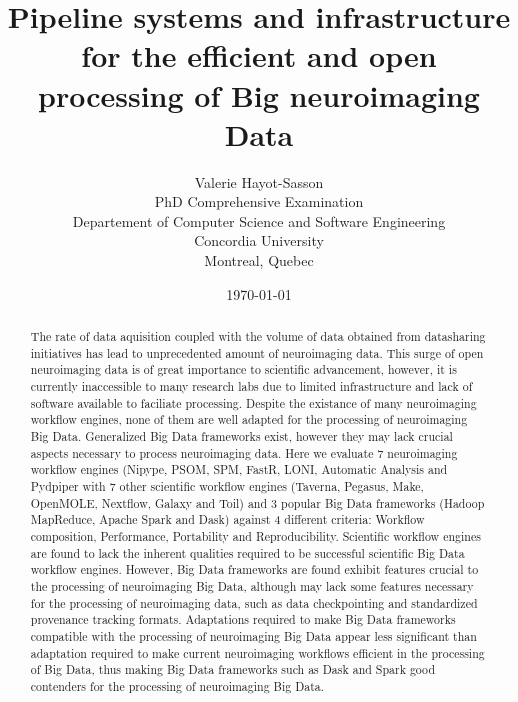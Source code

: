 \documentclass{report}
\begin{document}
 
    \title{Pipeline systems and infrastructure for the efficient
            and open processing of Big neuroimaging Data} 
    \author{Valerie Hayot-Sasson \\
    PhD Comprehensive Examination\\
    Departement of Computer Science and Software Engineering \\
    Concordia University \\
    Montreal, Quebec
    }
    \date{\today}
    \maketitle 
    
    \begin{abstract}
        The rate of data aquisition coupled with the volume of data obtained 
        from datasharing initiatives has lead to unprecedented amount of 
        neuroimaging data. This surge of open neuroimaging data is of great 
        importance to scientific advancement, however, it is currently 
        inaccessible to many research labs due to limited infrastructure and 
        lack of software available to faciliate processing. Despite the existance
        of many neuroimaging workflow engines, none of them are well adapted for
        the processing of neuroimaging Big Data. Generalized Big Data frameworks
        exist, however they may lack crucial aspects necessary to process neuroimaging
        data. Here we evaluate 7 neuroimaging workflow engines (Nipype, PSOM, SPM, FastR,
        LONI, Automatic Analysis and Pydpiper with 7 other scientific workflow
        engines (Taverna, Pegasus, Make, OpenMOLE, Nextflow, Galaxy and Toil) and
        3 popular Big Data frameworks (Hadoop MapReduce, Apache Spark and Dask) 
        against 4 different criteria: Workflow composition, Performance, Portability
        and Reproducibility. Scientific workflow engines are found to lack the 
        inherent qualities required to be successful scientific Big Data workflow 
        engines. However, Big Data frameworks are found exhibit features crucial
        to the processing of neuroimaging Big Data, although may lack some features
        necessary for the processing of neuroimaging data, such as data checkpointing and 
        standardized provenance tracking formats. Adaptations required to make Big
        Data frameworks compatible with the processing of neuroimaging Big Data 
        appear less significant than adaptation required to make current neuroimaging 
        workflows efficient in the processing of Big Data, thus making Big Data frameworks
        such as Dask and Spark good contenders for the processing of neuroimaging Big Data.
        
         
    \end{abstract} 
    \tableofcontents
\end{document}
